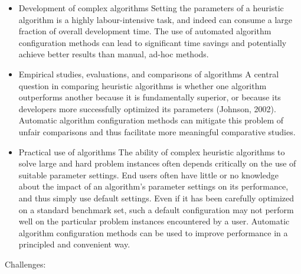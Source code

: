 \documentclass{article}
\begin{document}
{\begin{itemize}	
	\item Development of complex algorithms 
	Setting the parameters of a heuristic algorithm is a highly labour-intensive task, and indeed can consume a large fraction of overall development time. The use of automated algorithm configuration methods can lead to significant time savings and potentially achieve better results than manual, ad-hoc methods.
	\item Empirical studies, evaluations, and comparisons of algorithms 
	A central question in comparing heuristic algorithms is whether one algorithm outperforms another because it is fundamentally superior, or because its developers more successfully optimized its parameters (Johnson, 2002). Automatic algorithm configuration methods can mitigate this problem of unfair comparisons and thus facilitate more meaningful comparative studies.
	\item Practical use of algorithms 
	The ability of complex heuristic algorithms to solve large and hard problem instances often depends critically on the use of suitable parameter settings. End users often have little or no knowledge about the impact of an algorithm’s parameter settings on its performance, and thus simply use default settings. Even if it has been carefully optimized on a standard benchmark set, such a default configuration may not perform well on the particular problem instances encountered by a user. Automatic algorithm configuration methods can be used to improve performance in a principled and convenient way.
\end{itemize}



Challenges:

}
\end{document}
